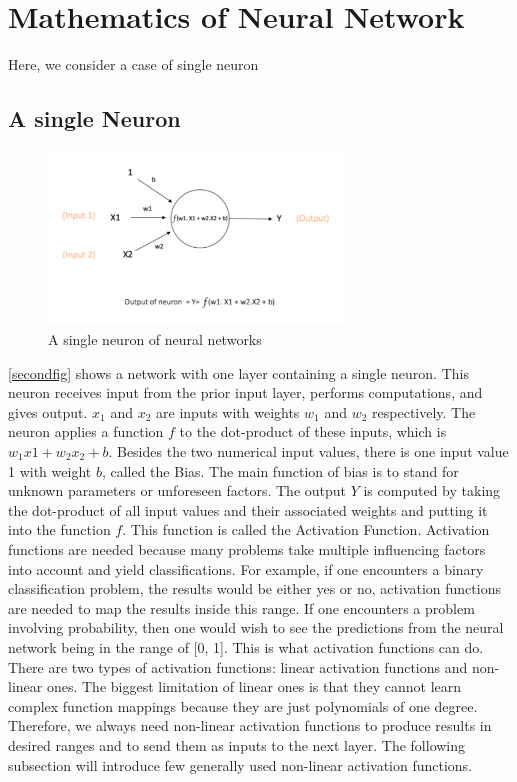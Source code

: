 \documentclass[a4paper,11pt,oneside]{book}
\begin{document}
\section{Mathematics of Neural Network}

Here, we consider a case of single neuron


\subsection{A single Neuron}
\begin{figure}[!h]
	\centering
	\includegraphics[width=0.7\textwidth]{figures/neuron}
	\caption{A single neuron of neural networks}
	\label{secondfig}
\end{figure}

\autoref{secondfig} shows a network with one layer containing a single neuron. This neuron receives input from the prior input layer, performs computations, and gives output. $x_1$ and $x_2$ are inputs with weights $w_1$ and $w_2$ respectively. The neuron applies a function $f$ to the dot-product of these inputs, which is $w_{1}x{1}+w_{2}x_{2}+b$.  Besides the two numerical input values, there is one input value 1 with weight $b$, called the Bias. The main function of bias is to stand for unknown parameters or unforeseen factors. The output $Y$ is computed by taking the dot-product of all input
values and their associated weights and putting it into the function $f$. This function is called the Activation Function.\newline\newline
Activation functions are needed because many problems take multiple influencing factors into account and yield classifications. For example, if one encounters a binary classification problem, the results would
be either yes or no, activation functions are needed to map the results
inside this range. If one encounters a problem involving probability, then
one would wish to see the predictions from the neural network being in
the range of [0, 1]. This is what activation functions can do.\newline\newline
There are two types of activation functions: linear activation
functions and non-linear ones. The biggest limitation of linear ones is
that they cannot learn complex function mappings because they are
just polynomials of one degree. Therefore, we always need non-linear
activation functions to produce results in desired ranges and to send
them as inputs to the next layer. The following subsection will introduce
few generally used non-linear activation functions.
\end{document}
